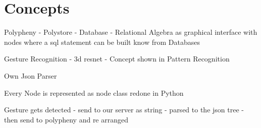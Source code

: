 \section{Concepts}
\label{g1:sec:concepts} %


Polypheny - Polystore - Database - Relational Algebra as graphical interface with nodes where a sql statement can be built know from Databases

Gesture Recognition - 3d resnet - Concept shown in Pattern Recognition

Own Json Parser

Every Node is represented as node class redone in Python 

Gesture gets detected - send to our server as string - parsed to the json tree - then send to polypheny and re arranged


